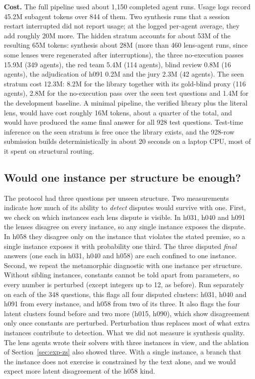 \documentclass[conference]{IEEEtran}
\begin{document}
\textbf{Cost.} The full pipeline used about 1{,}150 completed agent runs. Usage logs record 45.2M subagent tokens over
844 of them. Two synthesis runs
that a session restart interrupted did not report usage; at the logged per-agent average, they add roughly 20M more.
The hidden stratum accounts for about 53M of the resulting 65M tokens: synthesis about 28M (more than 460 lens-agent
runs, since some lenses were regenerated after interruptions), the three no-execution passes 15.9M (349 agents), the
red team 5.4M (114 agents), blind review 0.8M (16 agents), the adjudication of h091 0.2M and the jury 2.3M (42
agents). The seen stratum cost 12.3M: 8.2M for the library together with its gold-blind proxy (116 agents), 2.8M for
the no-execution pass over the seen test questions and 1.4M for the development baseline. A minimal pipeline, the
verified library plus the literal lens, would have cost roughly 16M tokens, about a quarter of the total, and would
have produced the same final answer for all 928 test questions. Test-time inference
on the seen stratum is free once the library exists, and the 928-row submission builds deterministically in about
20 seconds on a laptop CPU, most of it spent on structural routing.

\subsection{Would one instance per structure be enough?}\label{sec:oneinstance}
The protocol had three questions per unseen structure. Two measurements indicate how much of its ability to
\emph{detect} disputes would survive with one. First, we check on which instances each lens dispute is visible. In
h031, h040 and h091 the lenses disagree on every instance, so any single instance exposes the dispute. In h058 they
disagree only on the instance that violates the stated premise, so a single instance exposes it with probability one
third. The three disputed \emph{final} answers (one each in h031, h040 and h058) are each confined to one instance.
Second, we repeat the metamorphic diagnostic with one instance per structure. Without sibling instances, constants
cannot be told apart from parameters, so every number is perturbed (except integers up to 12, as before). Run
separately on each of the 348
questions, this flags all four disputed clusters: h031, h040 and h091 from every instance, and h058 from two of its
three. It also flags the four latent clusters found before and two more (h015, h090), which show disagreement only
once constants are perturbed. Perturbation thus replaces most of what extra instances contribute to
detection. What we did not measure is synthesis quality. The lens agents wrote their solvers with three instances in
view, and the ablation of Section~\ref{sec:exp-zs} also showed three. With a single instance, a branch that the
instance does not exercise is constrained by the text alone, and we would expect more latent disagreement of the h058
kind.
\end{document}
